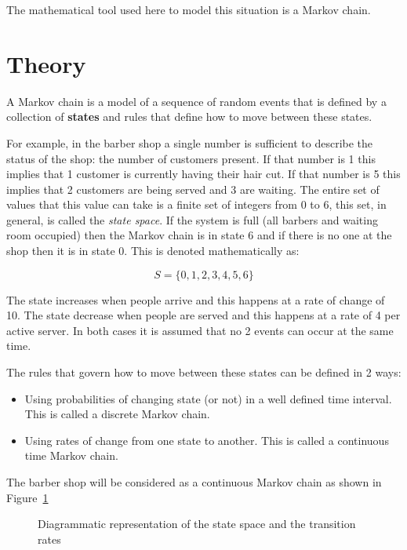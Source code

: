 The mathematical tool used here to model this situation is a Markov chain.

\section{Theory}\label{sec:theory}

A Markov chain is a model of a sequence of random events that is defined by a
collection of \textbf{states} and rules that define how to move between these
states.

For example, in the barber shop a single number is sufficient to describe the
status of the shop: the number of customers present.
If that number is 1 this implies that 1 customer is
currently having their hair cut. If that number is 5 this implies that 2
customers are being served and 3 are waiting. The entire set of values that this value can take
is
a finite set of integers from 0 to 6, this set, in general, is called the \textit{state space}.
If the system is full (all barbers
and waiting room occupied) then the Markov chain is in state 6 and if there is no one at the
shop then it is in state 0. This is denoted mathematically as:

\begin{equation}
    S = \{0, 1, 2, 3, 4, 5, 6\}
    \label{eqn:barber_shop_state_space}
\end{equation}

The state increases when people arrive and this happens at a rate of change of
10. The state decrease when people are served and this happens at a rate of 4
per active server. In both cases it is assumed that no 2 events can occur at
the same time.

The rules that govern how to move between these states can be defined in 2
ways:

\begin{itemize}
    \item Using probabilities of changing state (or not) in a well defined time
        interval. This is called a discrete Markov chain.
    \item Using rates of change from one state to another. This is called a
        continuous time Markov chain.
\end{itemize}

The barber shop will be considered as a continuous Markov chain as shown
in Figure~\ref{fig:barber-shop-continuous-markov-process}

\begin{figure}[!hbtp]
    \begin{center}
    
    \end{center}
    \caption{Diagrammatic representation of the state space and the transition
    rates}
    \label{fig:barber-shop-continuous-markov-process}
\end{figure}


